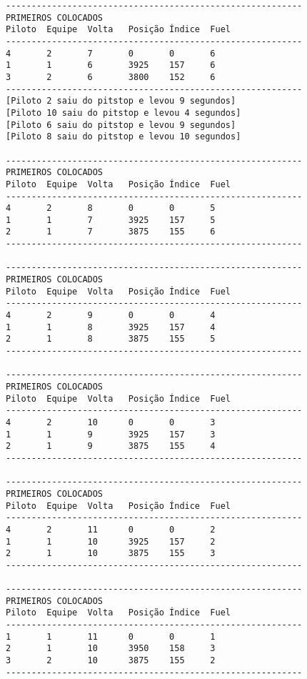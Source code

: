 \documentclass[12pt]{article}
\begin{document}
\begin{verbatim}
----------------------------------------------------------
PRIMEIROS COLOCADOS
Piloto  Equipe  Volta   Posição Índice  Fuel
----------------------------------------------------------
4       2       7       0       0       6
1       1       6       3925    157     6
3       2       6       3800    152     6
----------------------------------------------------------
[Piloto 2 saiu do pitstop e levou 9 segundos]
[Piloto 10 saiu do pitstop e levou 4 segundos]
[Piloto 6 saiu do pitstop e levou 9 segundos]
[Piloto 8 saiu do pitstop e levou 10 segundos]

----------------------------------------------------------
PRIMEIROS COLOCADOS
Piloto  Equipe  Volta   Posição Índice  Fuel
----------------------------------------------------------
4       2       8       0       0       5
1       1       7       3925    157     5
2       1       7       3875    155     6
----------------------------------------------------------

----------------------------------------------------------
PRIMEIROS COLOCADOS
Piloto  Equipe  Volta   Posição Índice  Fuel
----------------------------------------------------------
4       2       9       0       0       4
1       1       8       3925    157     4
2       1       8       3875    155     5
----------------------------------------------------------

----------------------------------------------------------
PRIMEIROS COLOCADOS
Piloto  Equipe  Volta   Posição Índice  Fuel
----------------------------------------------------------
4       2       10      0       0       3
1       1       9       3925    157     3
2       1       9       3875    155     4
----------------------------------------------------------

----------------------------------------------------------
PRIMEIROS COLOCADOS
Piloto  Equipe  Volta   Posição Índice  Fuel
----------------------------------------------------------
4       2       11      0       0       2
1       1       10      3925    157     2
2       1       10      3875    155     3
----------------------------------------------------------

----------------------------------------------------------
PRIMEIROS COLOCADOS
Piloto  Equipe  Volta   Posição Índice  Fuel
----------------------------------------------------------
1       1       11      0       0       1
2       1       10      3950    158     3
3       2       10      3875    155     2
----------------------------------------------------------


\end{verbatim}
\end{document}
